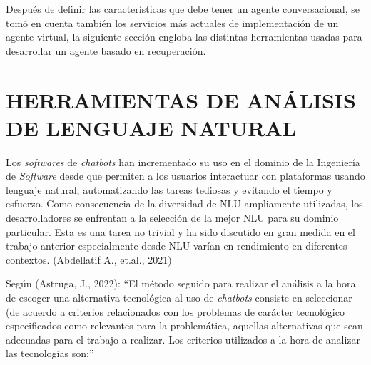 \documentclass[letter, openright, 12pt]{book}
\begin{document}
Después de definir las características que debe tener un agente conversacional, se tomó en cuenta también los servicios más actuales de implementación de un agente virtual, la siguiente sección engloba las distintas herramientas usadas para desarrollar un agente basado en recuperación. 

\section{HERRAMIENTAS DE ANÁLISIS DE LENGUAJE NATURAL}

Los \textit{softwares} de \textit{chatbots} han incrementado su uso en el dominio de la Ingeniería de \textit{Software} desde que permiten a los usuarios interactuar con plataformas usando lenguaje natural, automatizando las tareas tediosas y evitando el tiempo y esfuerzo. Como consecuencia de la diversidad de NLU ampliamente utilizadas, los desarrolladores se enfrentan a la selección de la mejor NLU para su dominio particular. Esta es una tarea no trivial y ha sido discutido en gran medida en el trabajo anterior especialmente desde NLU varían en rendimiento en diferentes contextos. (Abdellatif A., et.al., 2021)
\par
Según (Astruga, J., 2022): “El método seguido para realizar el análisis a la hora de escoger una alternativa tecnológica al uso de \textit{chatbots} consiste en seleccionar (de acuerdo a criterios relacionados con los problemas de carácter tecnológico especificados como relevantes para la problemática, aquellas alternativas que sean adecuadas para el trabajo a realizar. Los criterios utilizados a la hora de analizar las tecnologías son:”
\end{document}
